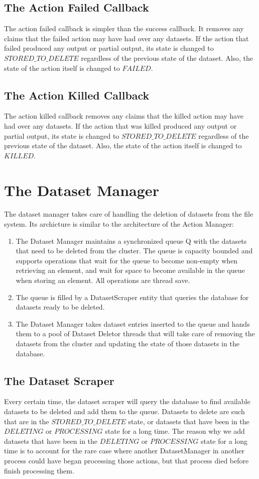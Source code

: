 \subsection{The Action Failed Callback}
The action failed callback is simpler than the success callback. It removes any claims that the failed action may have had over any datasets. If the action that failed produced any output or partial output, its state is changed to $STORED\_TO\_DELETE$ regardless of the previous state of the dataset. Also, the state of the action itself is changed to $FAILED$.

\subsection{The Action Killed Callback}
The action killed callback removes any claims that the killed action may have had over any datasets. If the action that was killed produced any output or partial output, its state is changed to $STORED\_TO\_DELETE$ regardless of the previous state of the dataset. Also, the state of the action itself is changed to $KILLED$.

\section{The Dataset Manager}
The dataset manager takes care of handling the deletion of datasets from the file system. Its archicture is similar to the architecture of the Action Manager:

\begin{enumerate}
\item The Dataset Manager maintains a synchronized queue Q with the datasets that need to be deleted from the cluster. The queue is capacity bounded and supports operations that wait for the queue to become non-empty when retrieving an element, and wait for space to become available in the queue when storing an element. All operations are thread save.
\item The queue is filled by a DatasetScraper entity that queries the database for datasets ready to be deleted.
\item The Dataset Manager takes dataset entries inserted to the queue and hands them to a pool of Dataset Deletor threads that will take care of removing the datasets from the cluster and updating the state of those datasets in the database.
\end{enumerate}

\subsection{The Dataset Scraper}
Every certain time, the dataset scraper will query the database to find available datasets to be deleted and add them to the queue. Datasets to delete are such that are in the $STORED\_TO\_DELETE$ state, or datasets that have been in the $DELETING$ or $PROCESSING$ state for a long time. The reason why we add datasets that have been in the $DELETING$ or $PROCESSING$ state for a long time is to account for the rare case where another DatasetManager in another process could have began processing those actions, but that process died before finish processing them.


